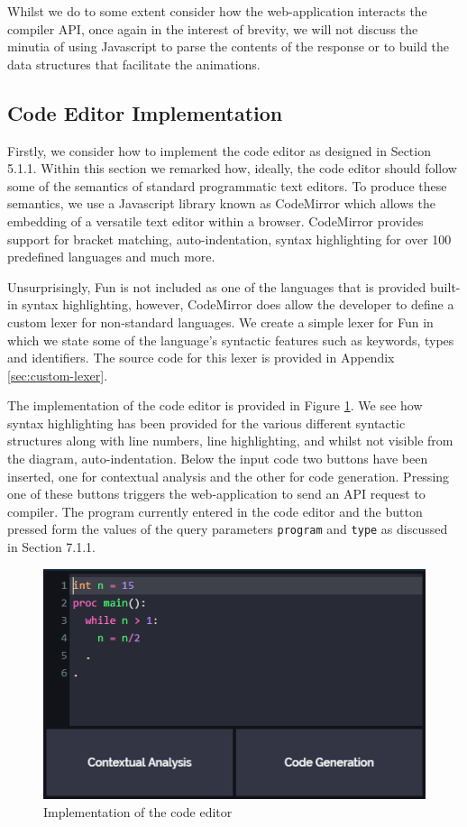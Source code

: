 \documentclass{l4proj}
\begin{document}
Whilst we do to some extent consider how the web-application interacts the compiler API, once again in the interest of brevity, we will not discuss the minutia of using Javascript to parse the contents of the response or to build the data structures that facilitate the animations.

\subsection{Code Editor Implementation}
Firstly, we consider how to implement the code editor as designed in Section 5.1.1. Within this section we remarked how, ideally, the code editor should follow some of the semantics of standard programmatic text editors. To produce these semantics, we use a Javascript library known as CodeMirror which allows the embedding of a versatile text editor within a browser. CodeMirror provides support for bracket matching, auto-indentation, syntax highlighting for over 100 predefined languages and much more.

Unsurprisingly, Fun is not included as one of the languages that is provided built-in syntax highlighting, however, CodeMirror does allow the developer to define a custom lexer for non-standard languages. We create a simple lexer for Fun in which we state some of the language's syntactic features such as keywords, types and identifiers. The source code for this lexer is provided in Appendix \ref{sec:custom-lexer}. 

The implementation of the code editor is provided in Figure \ref{fig:implcode}. We see how syntax highlighting has been provided for the various different syntactic structures along with line numbers, line highlighting, and whilst not visible from the diagram, auto-indentation. Below the input code two buttons have been inserted, one for contextual analysis and the other for code generation. Pressing one of these buttons triggers the web-application to send an API request to compiler. The program currently entered in the code editor and the button pressed form the values of the query parameters \texttt{program} and \texttt{type} as discussed in Section 7.1.1.
\begin{figure}[h]
\centering
\includegraphics[scale=0.5]{images/implcode.png}
\caption{Implementation of the code editor}
\label{fig:implcode}	
\end{figure}
\end{document}
